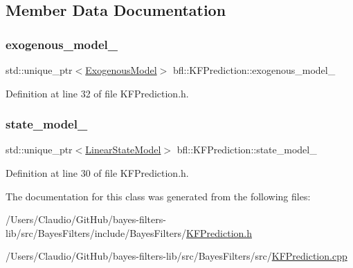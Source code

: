 \subsection{Member Data Documentation}
\mbox{\label{classbfl_1_1KFPrediction_a3b862c03224b94a323dd4d3d60a65622}} 
\subsubsection{\texorpdfstring{exogenous\+\_\+model\+\_\+}{exogenous\_model\_}}
{\footnotesize\ttfamily std\+::unique\+\_\+ptr$<$\mbox{\hyperlink{classbfl_1_1ExogenousModel}{Exogenous\+Model}}$>$ bfl\+::\+K\+F\+Prediction\+::exogenous\+\_\+model\+\_\+\hspace{0.3cm}{\ttfamily [protected]}}



Definition at line 32 of file K\+F\+Prediction.\+h.

\mbox{\label{classbfl_1_1KFPrediction_ab3230d88e673642feced141b05c2a804}} 
\subsubsection{\texorpdfstring{state\+\_\+model\+\_\+}{state\_model\_}}
{\footnotesize\ttfamily std\+::unique\+\_\+ptr$<$\mbox{\hyperlink{classbfl_1_1LinearStateModel}{Linear\+State\+Model}}$>$ bfl\+::\+K\+F\+Prediction\+::state\+\_\+model\+\_\+\hspace{0.3cm}{\ttfamily [protected]}}



Definition at line 30 of file K\+F\+Prediction.\+h.



The documentation for this class was generated from the following files\+:\begin{DoxyCompactItemize}
\item 
/\+Users/\+Claudio/\+Git\+Hub/bayes-\/filters-\/lib/src/\+Bayes\+Filters/include/\+Bayes\+Filters/\mbox{\hyperlink{KFPrediction_8h}{K\+F\+Prediction.\+h}}\item 
/\+Users/\+Claudio/\+Git\+Hub/bayes-\/filters-\/lib/src/\+Bayes\+Filters/src/\mbox{\hyperlink{KFPrediction_8cpp}{K\+F\+Prediction.\+cpp}}\end{DoxyCompactItemize}
